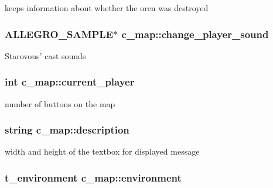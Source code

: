 keeps information about whether the oren was destroyed \hypertarget{classc__map_a046d71e73934bf557644cd207facccdf}{
\subsubsection[{change\-\_\-player\-\_\-sound}]{\setlength{\rightskip}{0pt plus 5cm}A\-L\-L\-E\-G\-R\-O\-\_\-\-S\-A\-M\-P\-L\-E$\ast$ c\-\_\-map\-::change\-\_\-player\-\_\-sound\hspace{0.3cm}{\ttfamily [protected]}}}\label{classc__map_a046d71e73934bf557644cd207facccdf}
Starovous' cast sounds \hypertarget{classc__map_aee9ff4ca6cc941590f843b7c88b50067}{
\subsubsection[{current\-\_\-player}]{\setlength{\rightskip}{0pt plus 5cm}int c\-\_\-map\-::current\-\_\-player\hspace{0.3cm}{\ttfamily [protected]}}}\label{classc__map_aee9ff4ca6cc941590f843b7c88b50067}
number of buttons on the map \hypertarget{classc__map_ad1b2ee98d03858d529bf35854473ecc6}{
\subsubsection[{description}]{\setlength{\rightskip}{0pt plus 5cm}string c\-\_\-map\-::description\hspace{0.3cm}{\ttfamily [protected]}}}\label{classc__map_ad1b2ee98d03858d529bf35854473ecc6}
width and height of the textbox for displayed message \hypertarget{classc__map_a7717281184aa1c3eca2d1b2377a16d9d}{
\subsubsection[{environment}]{\setlength{\rightskip}{0pt plus 5cm}t\-\_\-environment c\-\_\-map\-::environment\hspace{0.3cm}{\ttfamily [protected]}}}\label{classc__map_a7717281184aa1c3eca2d1b2377a16d9d}
